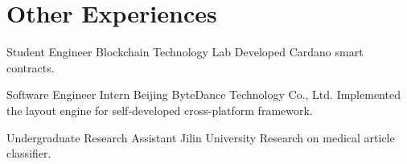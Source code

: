 \section{Other Experiences}

{Student Engineer}
{Blockchain Technology Lab}
{}
{}
{Developed Cardano smart contracts.}

{Software Engineer Intern}
{Beijing ByteDance Technology Co., Ltd.}
{}
{}
{Implemented the layout engine for self-developed cross-platform framework.}

{Undergraduate Research Assistant}
{Jilin University}
{}
{}
{Research on medical article classifier.}
